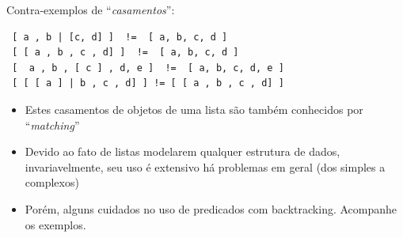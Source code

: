 \begin{frame}[fragile, allowframebreaks=0.9]
\begin{block}{Contra-exemplos de ``{\em casamentos}'':}
\begin{verbatim}
 [ a , b | [c, d] ]  !=  [ a, b, c, d ]
 [ [ a , b , c , d] ]  !=  [ a, b, c, d ]
 [  a , b , [ c ] , d, e ]  !=  [ a, b, c, d, e ]
 [ [ [ a ] | b , c , d] ] != [ [ a , b , c , d] ]
 \end{verbatim}

\end{block}

\framebreak
\begin{itemize}
  \item Estes  casamentos de objetos de uma lista
  são também conhecidos  por ``{\em matching}'' 

\item  Devido ao fato de listas modelarem
qualquer estrutura de dados, invariavelmente, seu uso  é extensivo
há  problemas em geral (dos simples a complexos)

\item Porém, alguns cuidados no uso de predicados com backtracking. Acompanhe os
exemplos.

\end{itemize}


\end{frame}



